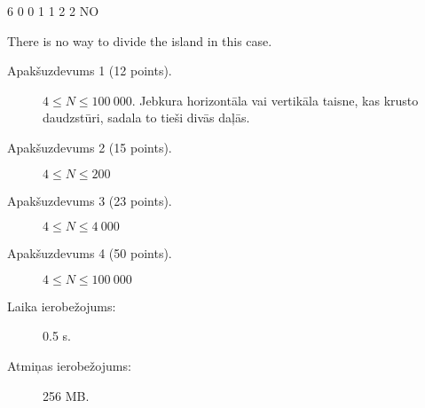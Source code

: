 \documentclass{boi2014-lv}
\begin{document}
	\example
	{
		6  0  0  1  1  2  2
	}
	{
		NO
	}
    {
        There is no way to divide the island in this case.
        \begin{center}
        \end{center}
    }


    \Scoring

    \begin{description}
        \item[Apakšuzdevums 1 (12 points).] $4 \le N \le 100\ 000$.
	Jebkura horizontāla vai vertikāla taisne, kas krusto daudzstūri, sadala to tieši divās daļās.

        \item[Apakšuzdevums 2 (15 points).] $4 \le N \le 200$
        \item[Apakšuzdevums 3 (23 points).] $4 \le N \le 4\ 000$
        \item[Apakšuzdevums 4 (50 points).] $4 \le N \le 100\ 000$
    \end{description}

    \Constraints

    \begin{description}
        \item[Laika ierobežojums:] 0.5 s.
        \item[Atmiņas ierobežojums:] 256 MB.
    \end{description}
\end{document}
